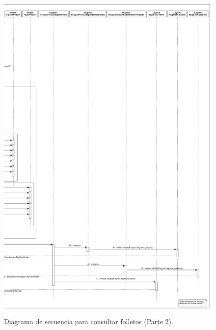 \FloatBarrier
\begin{figure}[htbp!]
		\centering
			\includegraphics[width=.88 \textwidth]{imagenes/Diagramas_UserApp/Nuevos_diagramas/consultarFolletos2}
		\caption{Diagrama de secuencia para consultar folletos (Parte 2).}
		\label{image:DSConsultarFolletos3}
\end{figure}
\FloatBarrier

